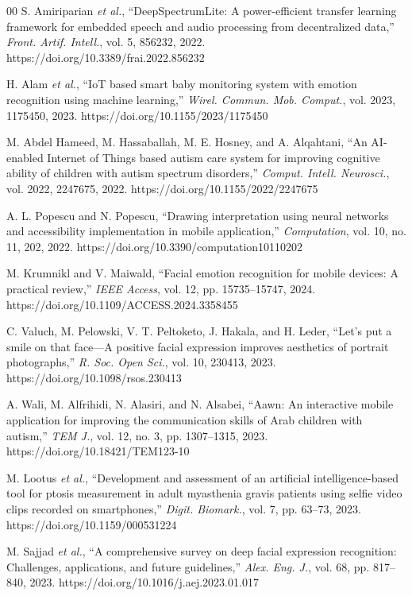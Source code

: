 \documentclass{ieeeaccess}
\begin{document}
\begin{thebibliography}{00}
		 S. Amiriparian \emph{et al.}, ``DeepSpectrumLite: A power-efficient transfer learning framework for embedded speech and audio processing from decentralized data,'' \emph{Front. Artif. Intell.}, vol. 5, 856232, 2022. https://doi.org/10.3389/frai.2022.856232
		
		 H. Alam \emph{et al.}, ``IoT based smart baby monitoring system with emotion recognition using machine learning,'' \emph{Wirel. Commun. Mob. Comput.}, vol. 2023, 1175450, 2023. https://doi.org/10.1155/2023/1175450
		
		 M. Abdel Hameed, M. Hassaballah, M. E. Hosney, and A. Alqahtani, ``An AI-enabled Internet of Things based autism care system for improving cognitive ability of children with autism spectrum disorders,'' \emph{Comput. Intell. Neurosci.}, vol. 2022, 2247675, 2022. https://doi.org/10.1155/2022/2247675
		
		 A. L. Popescu and N. Popescu, ``Drawing interpretation using neural networks and accessibility implementation in mobile application,'' \emph{Computation}, vol. 10, no. 11, 202, 2022. https://doi.org/10.3390/computation10110202
		
		 M. Krumnikl and V. Maiwald, ``Facial emotion recognition for mobile devices: A practical review,'' \emph{IEEE Access}, vol. 12, pp. 15735--15747, 2024. https://doi.org/10.1109/ACCESS.2024.3358455
		
		 C. Valuch, M. Pelowski, V. T. Peltoketo, J. Hakala, and H. Leder, ``Let's put a smile on that face---A positive facial expression improves aesthetics of portrait photographs,'' \emph{R. Soc. Open Sci.}, vol. 10, 230413, 2023. https://doi.org/10.1098/rsos.230413
		
		 A. Wali, M. Alfrihidi, N. Alasiri, and N. Alsabei, ``Aawn: An interactive mobile application for improving the communication skills of Arab children with autism,'' \emph{TEM J.}, vol. 12, no. 3, pp. 1307--1315, 2023. https://doi.org/10.18421/TEM123-10
		
		 M. Lootus \emph{et al.}, ``Development and assessment of an artificial intelligence-based tool for ptosis measurement in adult myasthenia gravis patients using selfie video clips recorded on smartphones,'' \emph{Digit. Biomark.}, vol. 7, pp. 63--73, 2023. https://doi.org/10.1159/000531224
		
		 M. Sajjad \emph{et al.}, ``A comprehensive survey on deep facial expression recognition: Challenges, applications, and future guidelines,'' \emph{Alex. Eng. J.}, vol. 68, pp. 817--840, 2023. https://doi.org/10.1016/j.aej.2023.01.017
		

\end{thebibliography}
\end{document}
